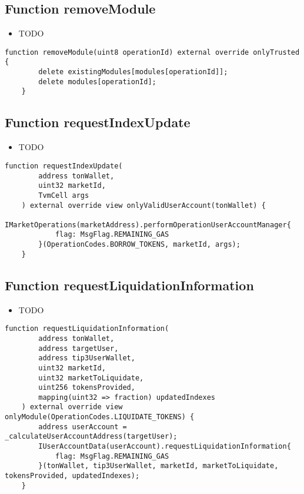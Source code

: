\subsection{Function removeModule}

\noindent\begin{itemize}
\item TODO
\end{itemize}

\begin{lstlisting}[firstnumber=549]
    function removeModule(uint8 operationId) external override onlyTrusted {
        delete existingModules[modules[operationId]];
        delete modules[operationId];
    }
\end{lstlisting}

\subsection{Function requestIndexUpdate}

\noindent\begin{itemize}
\item TODO
\end{itemize}

\begin{lstlisting}[firstnumber=223]
    function requestIndexUpdate(
        address tonWallet, 
        uint32 marketId, 
        TvmCell args
    ) external override view onlyValidUserAccount(tonWallet) {
        IMarketOperations(marketAddress).performOperationUserAccountManager{
            flag: MsgFlag.REMAINING_GAS
        }(OperationCodes.BORROW_TOKENS, marketId, args);
    }
\end{lstlisting}

\subsection{Function requestLiquidationInformation}

\noindent\begin{itemize}
\item TODO
\end{itemize}

\begin{lstlisting}[firstnumber=316]
    function requestLiquidationInformation(
        address tonWallet, 
        address targetUser, 
        address tip3UserWallet, 
        uint32 marketId, 
        uint32 marketToLiquidate,
        uint256 tokensProvided,
        mapping(uint32 => fraction) updatedIndexes
    ) external override view onlyModule(OperationCodes.LIQUIDATE_TOKENS) {
        address userAccount = _calculateUserAccountAddress(targetUser);
        IUserAccountData(userAccount).requestLiquidationInformation{
            flag: MsgFlag.REMAINING_GAS
        }(tonWallet, tip3UserWallet, marketId, marketToLiquidate, tokensProvided, updatedIndexes);
    }
\end{lstlisting}

